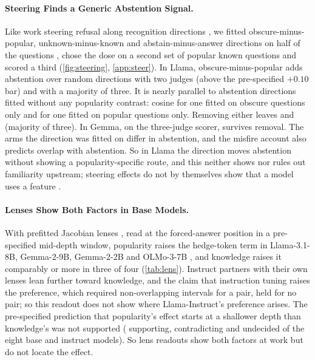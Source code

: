 \documentclass[manuscript,screen,review,anonymous,nonacm]{acmart}
\begin{document}
\paragraph{Steering Finds a Generic Abstention Signal.} Like work steering refusal along recognition directions \cite{ferrando2025iknow,brzezinka2026familiarity}, we fitted obscure-minus-popular, unknown-minus-known and abstain-minus-answer directions on half of the questions \cite{arditi2024refusal,rimsky2024caa}, chose the dose on a second set of popular known questions and scored a third (\cref{fig:steering}, \cref{app:steer}). In Llama, obscure-minus-popular adds \svLlamaDOne{} \svLlamaDOneCI{} abstention over random directions with two judges (above the pre-specified $+0.10$ bar) and \gaFam{} \gaFamCI{} with a majority of three. It is nearly parallel to abstention directions fitted without any popularity contrast: cosine \wlLlamaCos{} for one fitted on obscure questions only and \gaCos{} for one fitted on popular questions only. Removing either leaves \wlLlamaDTwo{} \wlLlamaDTwoCI{} and \gaPerp{} \gaPerpCI{} (majority of three). In Gemma, on the three-judge scorer, \svGemmaMajDTwo{} \svGemmaMajDTwoCI{} survives removal. The arms the direction was fitted on differ in abstention, and the misfire account also predicts overlap with abstention. So in Llama the direction moves abstention without showing a popularity-specific route, and this neither shows nor rules out familiarity upstream; steering effects do not by themselves show that a model uses a feature \cite{che2026steering}.

\paragraph{Lenses Show Both Factors in Base Models.} With prefitted Jacobian lenses \cite{gurnee2026workspace}, read at the forced-answer position in a pre-specified mid-depth window, popularity raises the hedge-token term in Llama-3.1-8B, Gemma-2-9B, Gemma-2-2B and OLMo-3-7B \cite{olmo3}, and knowledge raises it comparably or more in three of four (\cref{tab:lens}). Instruct partners with their own lenses lean further toward knowledge, and the claim that instruction tuning raises the preference, which required non-overlapping intervals for a pair, held for no pair; so this readout does not show where Llama-Instruct's preference arises. The pre-specified prediction that popularity's effect starts at a shallower depth than knowledge's was not supported (\jlSupports{} supporting, \jlContradicts{} contradicting and \jlUndecided{} undecided of the eight base and instruct models). So lens readouts show both factors at work but do not locate the effect.
\end{document}
